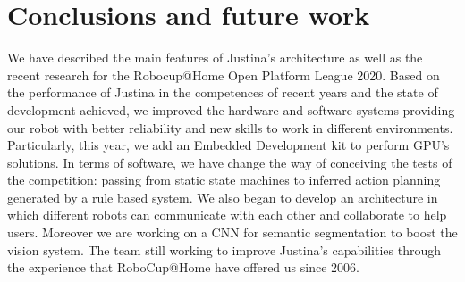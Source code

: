 \documentclass{llncs}
\begin{document}
\section{Conclusions and future work}\label{sec:conclusions}
We have described the main features of Justina's architecture as well as the recent research for the Robocup@Home Open Platform League 2020. Based on the performance of Justina in the competences of recent years and the state of development achieved, we improved the hardware and software systems providing our robot with better reliability and new skills to work in different environments. 
Particularly, this year, we add an Embedded Development kit \cite{jetson} to perform GPU's solutions.
In terms of software, we have change the way of conceiving the tests of the competition: passing from static state machines to inferred action planning generated by a rule based system.
We also began to develop an architecture in which different robots can communicate with each other and collaborate to help users. Moreover we are working on a CNN for semantic segmentation to boost the vision system.
The team still working to improve Justina's capabilities through the experience that RoboCup@Home have offered us since 2006.


%
%
\end{document}
